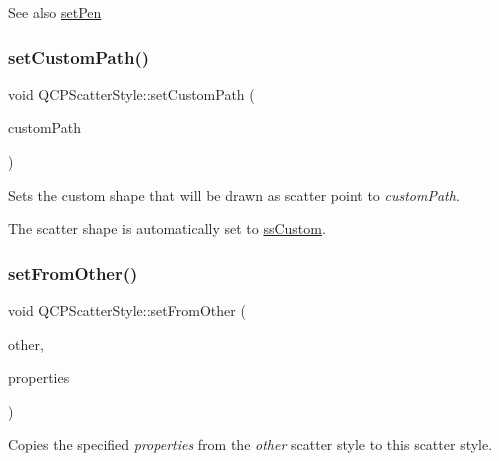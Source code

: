 \begin{DoxySeeAlso}{See also}
\mbox{\hyperlink{class_q_c_p_scatter_style_a761f1f229cc0ca4703e1e2b89f6dd1ba}{set\+Pen}} 
\end{DoxySeeAlso}
\mbox{\label{class_q_c_p_scatter_style_a96a3e949f90b2afe5677ca9412a12a1e}} 
\subsubsection{\texorpdfstring{set\+Custom\+Path()}{setCustomPath()}}
{\footnotesize\ttfamily void Q\+C\+P\+Scatter\+Style\+::set\+Custom\+Path (\begin{DoxyParamCaption}\item[{const Q\+Painter\+Path \&}]{custom\+Path }\end{DoxyParamCaption})}

Sets the custom shape that will be drawn as scatter point to {\itshape custom\+Path}.

The scatter shape is automatically set to \mbox{\hyperlink{class_q_c_p_scatter_style_adb31525af6b680e6f1b7472e43859349a15d9bcfd9de94edda949006529f9219d}{ss\+Custom}}. \mbox{\label{class_q_c_p_scatter_style_a7d59ba8864914f765817841089e436f1}} 
\subsubsection{\texorpdfstring{set\+From\+Other()}{setFromOther()}}
{\footnotesize\ttfamily void Q\+C\+P\+Scatter\+Style\+::set\+From\+Other (\begin{DoxyParamCaption}\item[{const \mbox{\hyperlink{class_q_c_p_scatter_style}{Q\+C\+P\+Scatter\+Style}} \&}]{other,  }\item[{Scatter\+Properties}]{properties }\end{DoxyParamCaption})}

Copies the specified {\itshape properties} from the {\itshape other} scatter style to this scatter style. \mbox{\label{class_q_c_p_scatter_style_a761f1f229cc0ca4703e1e2b89f6dd1ba}} 

